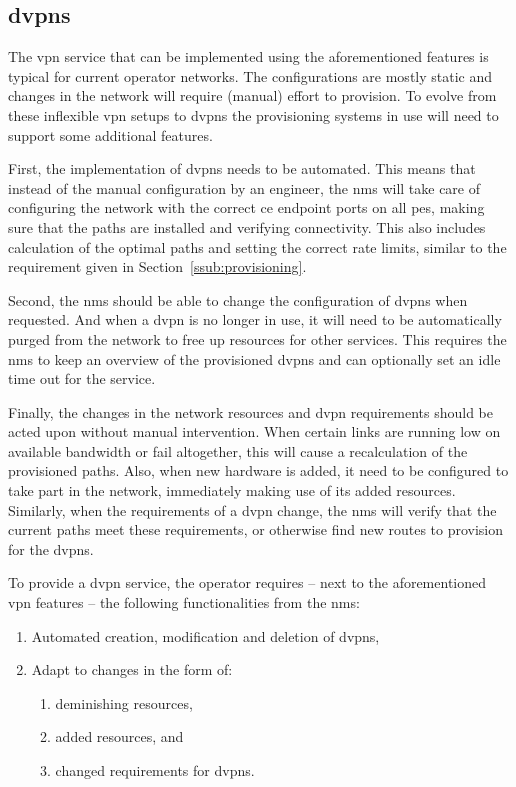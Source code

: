 



\subsection{\acsp{dvpn}} %
\label{sub:dvpn}


The \ac{vpn} service that can be implemented using the aforementioned features is typical for current operator networks. The configurations are mostly static and changes in the network will require (manual) effort to provision. To evolve from these inflexible \ac{vpn} setups to \aclp{dvpn} the provisioning systems in use will need to support some additional features.

First, the implementation of \acp{dvpn} needs to be automated. This means that instead of the manual configuration by an engineer, the \ac{nms} will take care of configuring the network with the correct \ac{ce} endpoint ports on all \acp{pe}, making sure that the paths are installed and verifying connectivity. This also includes calculation of the optimal paths and setting the correct rate limits, similar to the requirement given in Section~\ref{ssub:provisioning}.

Second, the \ac{nms} should be able to change the configuration of \acp{dvpn} when requested. And when a \ac{dvpn} is no longer in use, it will need to be automatically purged from the network to free up resources for other services. This requires the \ac{nms} to keep an overview of the provisioned \acp{dvpn} and can optionally set an idle time out for the service.

Finally, the changes in the network resources and \ac{dvpn} requirements should be acted upon without manual intervention. When certain links are running low on available bandwidth or fail altogether, this will cause a recalculation of the provisioned paths. Also, when new hardware is added, it need to be configured to take part in the network, immediately making use of its added resources. Similarly, when the requirements of a \ac{dvpn} change, the \ac{nms} will verify that the current paths meet these requirements, or otherwise find new routes to provision for the \acp{dvpn}.

To provide a \ac{dvpn} service, the operator requires -- next to the aforementioned \ac{vpn} features -- the following functionalities from the \ac{nms}:

\begin{enumerate}
	\item Automated creation, modification and deletion of \acp{dvpn},
	\item Adapt to changes in the form of:
	\begin{enumerate}
		\item deminishing resources,
		\item added resources, and
		\item changed requirements for \acp{dvpn}.
	\end{enumerate} 
\end{enumerate}


